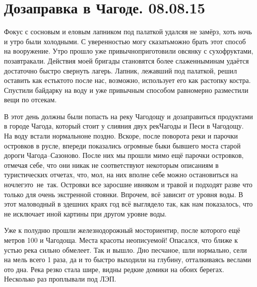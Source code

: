 \chapter{Дозаправка в Чагоде. 08.08.15}

Фокус с сосновым и еловым лапником под палаткой удался\mdash я не замёрз, хоть ночь и утро были холодными. С уверенностью могу сказать\mdash можно брать этот способ на вооружение. Утро прошло уже привычно\mdash приготовили овсянку с сухофруктами, позавтракали. Действия моей бригады становятся более слаженными\mdash нам удаётся достаточно быстро свернуть лагерь. Лапник, лежавший под палаткой, решил оставить как есть\mdash кто\sdash то после нас, возможно, использует его как растопку костра. Спустили байдарку на воду и уже привычным  способом равномерно разместили вещи по отсекам. 

В этот день должны были попасть на реку Чагодощу и дозаправиться продуктами в городе Чагода, который стоит у слияния двух рек\mdash Чагоды и Песи в Чагодощу. На воду встали нормально\mdash не поздно. Вскоре, после поворота реки и парочки островков в русле, впереди показались огромные быки бывшего моста старой дороги Чагода\nobreakdash--Сазоново. После них мы прошли мимо ещё парочки островков, отмечая себе, что они никак не соответствуют некоторым описаниям в туристических отчетах, что, мол, на них вполне себе можно остановиться на ночлег\mdash это~не~так. Островки все заросшие ивняком и травой и подходят разве что только для очень экстренной стоянки. Впрочем, всё зависит от уровня воды. В этот маловодный в здешних краях год всё выглядело так, как нам показалось, что не исключает иной картины при другом уровне воды. 

Уже к полудню прошли железнодорожный мост\mdash ориентир, после которого ещё метров 100 и Чагодоща. Места красоты неописуемой! Опасался, что ближе к устью река сильно обмелеет. Так и вышло. Дно песчаное, шли нормально, сели на мель всего 1 раза, да и то быстро выходили на глубину, отталкиваясь веслами ото дна. Река резко стала шире, видны редкие домики на обоих берегах. Несколько раз проплывали под ЛЭП. 

